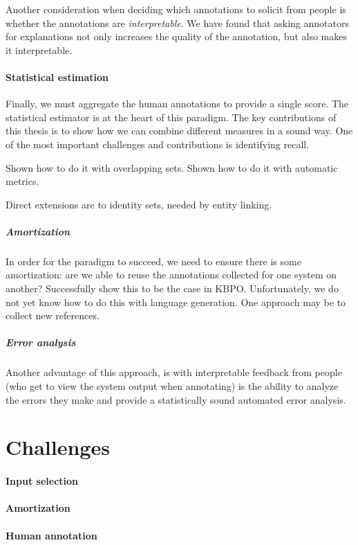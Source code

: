 Another consideration when deciding which annotations to solicit from people is whether the annotations are \textit{interpretable}.
We have found that asking annotators for explanations not only increases the quality of the annotation, but also makes it interpretable.

\paragraph{Statistical estimation}
Finally, we must aggregate the human annotations to provide a single score. 
The statistical estimator is at the heart of this paradigm.
The key contributions of this thesis is to show how we can combine different measures in a sound way.
One of the most important challenges and contributions is identifying recall.

Shown how to do it with overlapping sets.
Shown how to do it with automatic metrics.

Direct extensions are to identity sets, needed by entity linking.

\subparagraph{Amortization}

In order for the paradigm to succeed, we need to ensure there is some amortization: are we able to reuse the annotations collected for one system on another?
Successfully show this to be the case in KBPO\@.
Unfortunately, we do not yet know how to do this with language generation. One approach may be to collect new references.

\subparagraph{Error analysis}

Another advantage of this approach, is with interpretable feedback from people (who get to view the system output when annotating) is the ability to analyze the errors they make and provide a statistically sound automated error analysis.


\section{Challenges}

\paragraph{Input selection}
\paragraph{Amortization}
\paragraph{Human annotation}
